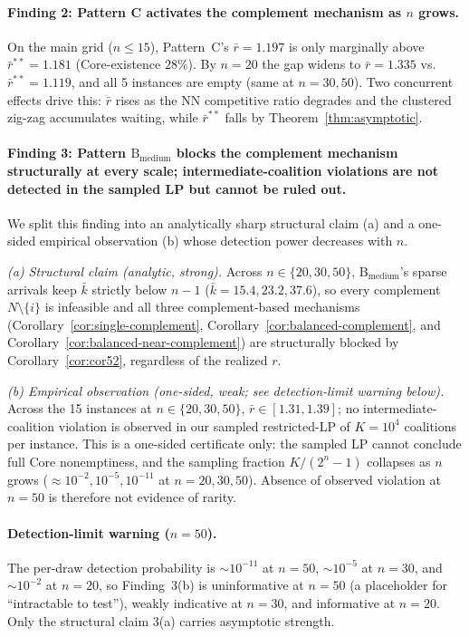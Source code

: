 \documentclass[11pt]{article}
\theoremstyle{plain}
\theoremstyle{definition}
\theoremstyle{remark}
\begin{document}
\paragraph{Finding 2: Pattern C activates the complement mechanism as $n$ grows.} On the main grid ($n\le 15$), Pattern~C's $\bar r = 1.197$ is only marginally above $\bar r^{\ast\ast}=1.181$ (Core-existence $28\%$). By $n=20$ the gap widens to $\bar r=1.335$ vs.\ $\bar r^{\ast\ast}=1.119$, and all 5 instances are empty (same at $n=30,50$). Two concurrent effects drive this: $\bar r$ rises as the NN competitive ratio degrades and the clustered zig-zag accumulates waiting, while $\bar r^{\ast\ast}$ falls by Theorem~\ref{thm:asymptotic}.

\paragraph{Finding 3: Pattern $\text{B}_{\text{medium}}$ blocks the complement mechanism structurally at every scale; intermediate-coalition violations are not detected in the sampled LP but cannot be ruled out.} We split this finding into an analytically sharp structural claim (a) and a one-sided empirical observation (b) whose detection power decreases with $n$.

\emph{(a) Structural claim (analytic, strong).} Across $n\in\{20,30,50\}$, $\text{B}_{\text{medium}}$'s sparse arrivals keep $\bar k$ strictly below $n-1$ ($\bar k = 15.4, 23.2, 37.6$), so every complement $N\setminus\{i\}$ is infeasible and all three complement-based mechanisms (Corollary~\ref{cor:single-complement}, Corollary~\ref{cor:balanced-complement}, and Corollary~\ref{cor:balanced-near-complement}) are structurally blocked by Corollary~\ref{cor:cor52}, regardless of the realized $r$.

\emph{(b) Empirical observation (one-sided, weak; see detection-limit warning below).} Across the 15 instances at $n\in\{20,30,50\}$, $\bar r \in [1.31,1.39]$; no intermediate-coalition violation is observed in our sampled restricted-LP of $K=10^{4}$ coalitions per instance. This is a one-sided certificate only: the sampled LP cannot conclude full Core nonemptiness, and the sampling fraction $K/(2^{n}-1)$ collapses as $n$ grows ($\approx 10^{-2}, 10^{-5}, 10^{-11}$ at $n=20,30,50$). Absence of observed violation at $n=50$ is therefore not evidence of rarity.

\paragraph{Detection-limit warning ($n=50$).} The per-draw detection probability is $\sim 10^{-11}$ at $n=50$, $\sim 10^{-5}$ at $n=30$, and $\sim 10^{-2}$ at $n=20$, so Finding~3(b) is uninformative at $n=50$ (a placeholder for ``intractable to test''), weakly indicative at $n=30$, and informative at $n=20$. Only the structural claim 3(a) carries asymptotic strength.
\end{document}
